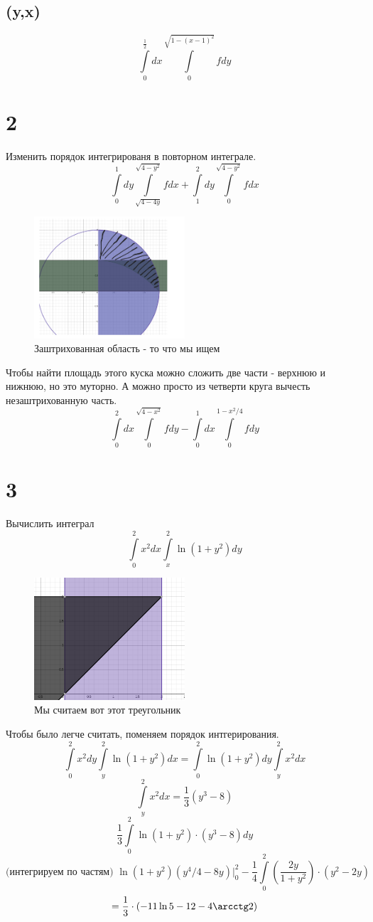 	 \subsection*{(y,x)}
	  		$$\int\limits_0^{\frac12}dx\int\limits_{0}^{\sqrt{1-(x-1)^2}}fdy$$
	  	\section*{2}
	  	Изменить порядок интегрированя в повторном интеграле. 
	  	$$\int\limits_{0}^{1}dy\int\limits_{\sqrt{4-4y}}^{\sqrt{4-y^2}} fdx+ \int\limits_{1}^{2}dy\int\limits_{0}^{\sqrt{4-y^2}} fdx$$
	  	\begin{figure}[h]
	  		\centering
	  		\includegraphics[width=0.5\textwidth]{Pasted image1}
	  		\caption{Заштрихованная область - то что мы ищем}
	  		\label{fig:example}
	  	\end{figure}
	  	Чтобы найти площадь этого куска можно сложить две части - верхнюю и нижнюю, но это муторно. А можно просто из четверти круга вычесть незаштрихованную часть. 
	  	$$\int\limits _0^2dx\int\limits_0^{\sqrt{4-x^2}}fdy - \int\limits _0^1dx\int\limits_0^{1-x^2/4}fdy$$
	  	\section*{3}
	  	Вычислить интеграл
	 $$\int\limits_0^2x^2dx\int\limits_{x}^{2}\ln(1+y^2)dy$$	
	 	  	\begin{figure}[h]
	 	\centering
	 	\includegraphics[width=0.5\textwidth]{Pasted image}
	 	\caption{Мы считаем вот этот треугольник }
	 	\label{fig:example}
	 \end{figure}
	 Чтобы было легче считать, поменяем порядок интгерирования. 
	 $$\int\limits_0^2x^2dy\int\limits_{y}^{2}\ln{(1+y^2)}dx =\int\limits_{0}^{2}\ln{(1+y^2)}dy\int\limits_{y}^{2}x^2dx $$
	 $$\int\limits_{y}^{2}x^2dx = \frac13\left(y^3-8\right)$$
	 $$\frac13\int\limits_{0}^{2}\ln{(1+y^2)}\cdot\left(y^3-8\right)dy$$
	 $$\text{(интегрируем по частям)  } \ln(1+y^2)(y^4/4-8y)|^2_0 -\frac14 \int\limits_{0}^{2}\left(\frac{2y}{1+y^2}\right)\cdot\left(y^2-2y\right) $$
	 $$= \frac13\cdot(-11\ln{5}-12-4\arcctg2)$$
